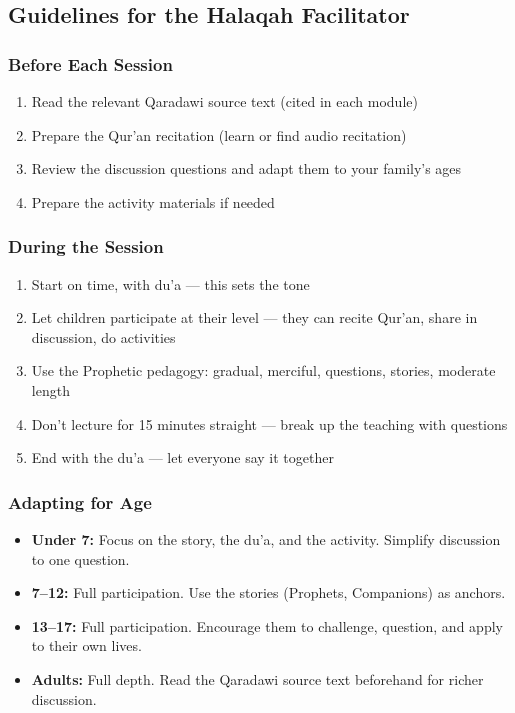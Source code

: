 \documentclass[11pt,a4paper]{article}
\begin{document}
\subsection*{Guidelines for the Halaqah Facilitator}

\subsubsection*{Before Each Session}
\begin{enumerate}
\item Read the relevant Qaradawi source text (cited in each module)
\item Prepare the Qur'an recitation (learn or find audio recitation)
\item Review the discussion questions and adapt them to your family's ages
\item Prepare the activity materials if needed
\end{enumerate}


\subsubsection*{During the Session}
\begin{enumerate}
\item Start on time, with du'a --- this sets the tone
\item Let children participate at their level --- they can recite Qur'an, share in discussion, do activities
\item Use the Prophetic pedagogy: gradual, merciful, questions, stories, moderate length
\item Don't lecture for 15 minutes straight --- break up the teaching with questions
\item End with the du'a --- let everyone say it together
\end{enumerate}


\subsubsection*{Adapting for Age}
\begin{itemize}
\item \textbf{Under 7:} Focus on the story, the du'a, and the activity. Simplify discussion to one question.
\item \textbf{7–12:} Full participation. Use the stories (Prophets, Companions) as anchors.
\item \textbf{13–17:} Full participation. Encourage them to challenge, question, and apply to their own lives.
\item \textbf{Adults:} Full depth. Read the Qaradawi source text beforehand for richer discussion.
\end{itemize}
\end{document}
